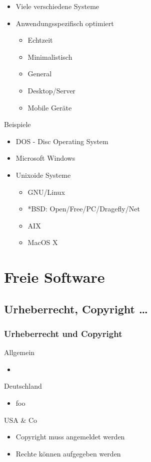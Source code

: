 \documentclass[compress]{beamer}
\begin{document}
\begin{frame}
	\begin{block}{}
		\begin{itemize}
			\item Viele verschiedene Systeme 
			\item Anwendungsspezifisch optimiert
				\begin{itemize}
					\item Echtzeit
					\item Minimalistisch
					\item General
					\item Desktop/Server
					\item Mobile Geräte 
				\end{itemize}
		\end{itemize}
	\end{block}
	\begin{block}{Beispiele}
		\begin{itemize}
			\item DOS - Disc Operating System
			\item Microsoft Windows
			\item Unixoide Systeme
				\begin{itemize}
					\item GNU/Linux
					\item *BSD: Open/Free/PC/Dragefly/Net
					\item AIX
					\item MacOS X
				\end{itemize}
		\end{itemize}
	\end{block}
\end{frame}

\section{Freie Software}
\subsection{Urheberrecht, Copyright \dots}
\begin{frame}
	\frametitle{Urheberrecht und Copyright}
	\begin{block}{Allgemein}
		\begin{itemize}
			\item 
		\end{itemize}
	\end{block}
	\begin{block}{Deutschland}
		\begin{itemize}
			\item foo
		\end{itemize}
	\end{block}
	\begin{block}{USA \& Co}
		\begin{itemize}
			\item Copyright muss angemeldet werden
			\item Rechte können aufgegeben werden
		\end{itemize}
	\end{block}
\end{frame}
\end{document}
